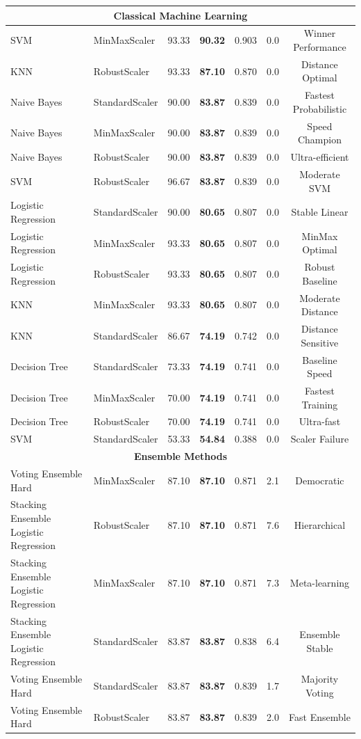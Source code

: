 \begin{table}[H]
{\begin{tabular}{|l|l|c|c|c|c|c|}
\hline
\multicolumn{7}{|c|}{\textbf{Classical Machine Learning}} \\
\hline
SVM & MinMaxScaler & 93.33 & \textbf{90.32} & 0.903 & 0.0 & Winner Performance \\
KNN & RobustScaler & 93.33 & \textbf{87.10} & 0.870 & 0.0 & Distance Optimal \\
Naive Bayes & StandardScaler & 90.00 & \textbf{83.87} & 0.839 & 0.0 & Fastest Probabilistic \\
Naive Bayes & MinMaxScaler & 90.00 & \textbf{83.87} & 0.839 & 0.0 & Speed Champion \\
Naive Bayes & RobustScaler & 90.00 & \textbf{83.87} & 0.839 & 0.0 & Ultra-efficient \\
SVM & RobustScaler & 96.67 & \textbf{83.87} & 0.839 & 0.0 & Moderate SVM \\
Logistic Regression & StandardScaler & 90.00 & \textbf{80.65} & 0.807 & 0.0 & Stable Linear \\
Logistic Regression & MinMaxScaler & 93.33 & \textbf{80.65} & 0.807 & 0.0 & MinMax Optimal \\
Logistic Regression & RobustScaler & 93.33 & \textbf{80.65} & 0.807 & 0.0 & Robust Baseline \\
KNN & MinMaxScaler & 93.33 & \textbf{80.65} & 0.807 & 0.0 & Moderate Distance \\
KNN & StandardScaler & 86.67 & \textbf{74.19} & 0.742 & 0.0 & Distance Sensitive \\
Decision Tree & StandardScaler & 73.33 & \textbf{74.19} & 0.741 & 0.0 & Baseline Speed \\
Decision Tree & MinMaxScaler & 70.00 & \textbf{74.19} & 0.741 & 0.0 & Fastest Training \\
Decision Tree & RobustScaler & 70.00 & \textbf{74.19} & 0.741 & 0.0 & Ultra-fast \\
SVM & StandardScaler & 53.33 & \textbf{54.84} & 0.388 & 0.0 & Scaler Failure \\
\hline
\multicolumn{7}{|c|}{\textbf{Ensemble Methods}} \\
\hline
Voting Ensemble Hard & MinMaxScaler & 87.10 & \textbf{87.10} & 0.871 & 2.1 & Democratic \\
Stacking Ensemble Logistic Regression & RobustScaler & 87.10 & \textbf{87.10} & 0.871 & 7.6 & Hierarchical \\
Stacking Ensemble Logistic Regression & MinMaxScaler & 87.10 & \textbf{87.10} & 0.871 & 7.3 & Meta-learning \\
Stacking Ensemble Logistic Regression & StandardScaler & 83.87 & \textbf{83.87} & 0.838 & 6.4 & Ensemble Stable \\
Voting Ensemble Hard & StandardScaler & 83.87 & \textbf{83.87} & 0.839 & 1.7 & Majority Voting \\
Voting Ensemble Hard & RobustScaler & 83.87 & \textbf{83.87} & 0.839 & 2.0 & Fast Ensemble \\
\hline
\end{tabular}%
}
\end{table}

